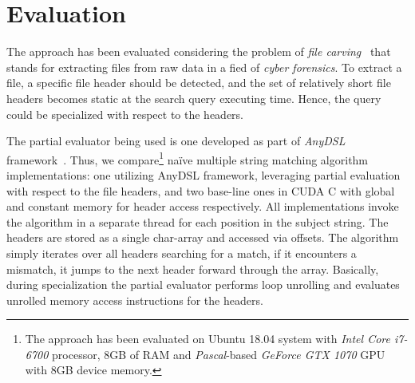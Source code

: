 \documentclass[sigplan]{acmart}\settopmatter{printacmref=false, printfolios=false}
\newcommand\todo[1]{{\color{red}#1}}
\begin{document}



\section{Evaluation}

The approach has been evaluated considering the problem of \textit{file carving}~\cite{DataCarving} that stands for extracting files from raw data in a fied of \emph{cyber forensics}. To extract a file, a specific file header should be detected, and the set of relatively short file headers becomes static at the search query executing time. Hence, the query could be specialized with respect to the headers. 

The partial evaluator being used is one developed as part of \textit{AnyDSL} framework~\cite{LeiBa}.
Thus, we compare\footnote{The approach has been evaluated on Ubuntu 18.04 system with \emph{Intel Core i7-6700} processor, 8GB of RAM and \emph{Pascal}-based \emph{GeForce GTX 1070} GPU with 8GB device memory.} na\"ive multiple string matching algorithm implementations: one utilizing AnyDSL framework, leveraging partial evaluation with respect to the file headers, and two base-line ones in CUDA C with global and constant memory for header access respectively.
All implementations invoke the algorithm in a separate thread for each position in the subject string.
The headers are stored as a single char-array and accessed via offsets.
The algorithm simply iterates over all headers searching for a match, if it encounters a mismatch, it jumps to the next header forward through the array. Basically, during specialization the partial evaluator performs loop unrolling and evaluates unrolled memory access instructions for the headers.
\end{document}
